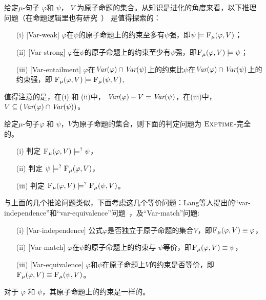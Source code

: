 给定$\mu$-句子 $\varphi$和 $\psi$， $V$ 为原子命题的集合。从知识是进化的角度来看，以下推理问题（在命题逻辑里也有研究~\cite{wang2015forgetting}） 是值得探索的：

\begin{itemize}
	\item[(i)] $[$Var-weak$]$ $\varphi$在$\psi$的原子命题上的约束至多有$\psi$强，即$\psi\models {\textsc{F}_{\textsc{$\mu$}}}(\varphi, V)$；
	\item[(ii)] $[$Var-strong$]$ $\varphi$在$\psi$的原子命题上的约束至少有$\psi$强，即${\textsc{F}_{\textsc{$\mu$}}}(\varphi, V)\models \psi$；
	\item[(iii)] $[$Var-entailment$]$ $\varphi$在$\textit{Var}(\varphi) \cap \textit{Var}(\psi)$上的约束比$\psi$在$\textit{Var}(\varphi) \cap \textit{Var}(\psi)$上的约束强，即 ${\textsc{F}_{\textsc{$\mu$}}}(\varphi, V) \models {\textsc{F}_{\textsc{$\mu$}}}(\psi, V)$,
\end{itemize}
值得注意的是，在(i) 和 (ii)中， $\textit{Var}(\varphi) - V = \textit{Var}(\psi)$，在(iii)中， $V \subseteq (\textit{Var}(\varphi) \cap \textit{Var}(\psi))$。

\begin{theorem}[Entailment]
	\label{thm:Ent}
	给定$\mu$-句子$\varphi$ 和 $\psi$，$V$为原子命题的集合，则下面的判定问题为 $\textsc{Exptime}$-完全的。
	\begin{itemize}
		\item[(i)] 判定  ${\textsc{F}_{\textsc{$\mu$}}}(\varphi, V ) \models^? \psi$，
		\item[(ii)] 判定  $\psi \models^? {\textsc{F}_{\textsc{$\mu$}}}(\varphi, V)$，
		\item[(iii)] 判定 ${\textsc{F}_{\textsc{$\mu$}}}(\varphi, V) \models^? {\textsc{F}_{\textsc{$\mu$}}}(\psi, V)$。
	\end{itemize}
\end{theorem}


与上面的几个推论问题类似，下面考虑这几个等价问题：Lang等人提出的“var-independence”和“var-equivalence”问题~\cite{lang2003propositional}，及“Var-match”问题:
\begin{itemize}
	\item[(i)] $[$Var-independence$]$ 公式$\varphi$是否独立于原子命题的集合$V$，即${\textsc{F}_{\textsc{$\mu$}}}(\varphi,V) \equiv \varphi$，
	\item[(ii)] $[$Var-match$]$  $\varphi$在$\psi$的原子命题上的约束与 $\psi$等价，即${\textsc{F}_{\textsc{$\mu$}}}(\varphi, V) \equiv \psi$，
	\item[(iii)] $[$Var-equivalence$]$  $\varphi$和$\psi$在原子命题上$V$的约束是否等价，即${\textsc{F}_{\textsc{$\mu$}}}(\varphi, V) \equiv {\textsc{F}_{\textsc{$\mu$}}}(\psi, V)$。
\end{itemize}
对于 $\varphi$ 和 $\psi$，其原子命题上的约束是一样的。

